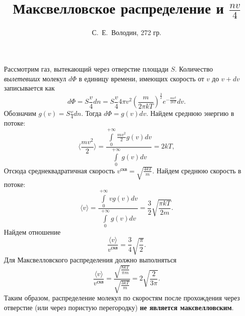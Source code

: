 \documentclass[a4paper]{article}
\title{Максвелловское распределение и {$\frac{nv}{4}$}}
\author{С.~Е.~Володин, 272 гр.}
\date{}
\begin{document}
\maketitle
Рассмотрим газ, вытекающий через отверстие площади $S$. Количество {\em вылетевших} молекул $d\Phi$ в единицу времени, имеющих скорость от $v$ до $v+dv$ записывается как
$$
d\Phi=S\frac{v}{4}dn=S\frac{v}{4}4\pi v^2 \left(\frac{m}{2\pi k T}\right)^\frac{3}{2}e^{-\frac{mv^2}{2 k T}}dv.
$$
Обозначим $g(v)=S\frac{v}{4}dn$. Тогда $d\Phi=g(v)dv.$\newline
Найдем среднюю энергию в потоке:
$$
\langle\frac{mv^2}{2}\rangle=\frac{\int\limits_{0}^{+\infty} \frac{mv^2}{2}g(v)dv}{\int\limits_{0}^{+\infty} g(v)dv}=2kT,
$$
Отсюда среднеквадратичная скорость $v^{\text{скв}}=\sqrt{\frac{4kT}{m}}$.\newline
Найдем среднюю скорость в потоке:
$$
\langle v\rangle=\frac{\int\limits_{0}^{+\infty} vg(v)dv}{\int\limits_{0}^{+\infty} g(v)dv}=\frac{3}{2}\sqrt{\frac{\pi k T}{2 m}}.
$$
Найдем отношение
$$
\frac{\langle v\rangle}{v^{\text{скв}}}=\frac{3}{4}\sqrt{\frac{\pi}{2}}.
$$
Для Максвелловского распределения должно выполняться
$$
\frac{\langle v\rangle}{v^{\text{скв}}}=\frac{\sqrt{\frac{8kT}{\pi m}}}{\sqrt{\frac{3kT}{m}}}=2\sqrt{\frac{2}{3 \pi}}.
$$
Таким образом, распределение молекул по скоростям после прохождения через отверстие (или через пористую перегородку) \textbf{не является максвелловским}.
\end{document}
